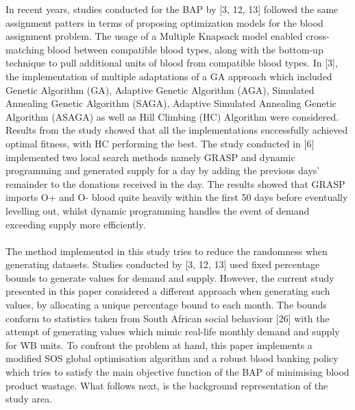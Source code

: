 \documentclass{article}
\begin{document}
In recent years, studies conducted for the BAP by [3, 12, 13] followed the same assignment patters in terms of proposing optimization models for the blood assignment problem. The usage of a Multiple Knapsack model enabled cross-matching blood between compatible blood types, along with the bottom-up technique to pull additional units of blood from compatible blood types. In [3], the implementation of multiple adaptations of a GA approach which included Genetic Algorithm (GA), Adaptive Genetic Algorithm (AGA), Simulated Annealing Genetic Algorithm (SAGA), Adaptive Simulated Annealing Genetic Algorithm (ASAGA) as well as Hill Climbing (HC) Algorithm were considered. Results from the study showed that all the implementations successfully achieved optimal fitness, with HC performing the best. The study conducted in [6] implemented two local search methods namely GRASP and dynamic programming and generated supply for a day by adding the previous days’ remainder to the donations received in the day. The results showed that GRASP imports O+ and O- blood quite heavily within the first 50 days before eventually levelling out, whilst dynamic programming handles the event of demand exceeding supply more efficiently.
\\
\\
The method implemented in this study tries to reduce the randomness when generating datasets. Studies conducted by [3, 12, 13] used fixed percentage bounds to generate values for demand and supply. However, the current study presented in this paper considered a different approach when generating such values, by allocating a unique percentage bound to each month. The bounds conform to statistics taken from South African social behaviour [26] with the attempt of generating values which mimic real-life monthly demand and supply for WB units. To confront the problem at hand, this paper implements a modified SOS global optimisation algorithm and a robust blood banking policy which tries to satisfy the main objective function of the BAP of minimising blood product wastage. What follows next, is the background representation of the study area.
\end{document}

